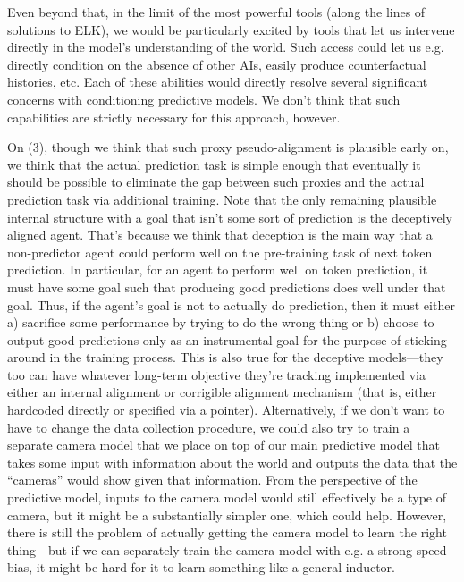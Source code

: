{Even beyond that, in the limit of the most powerful tools (along the lines of solutions to ELK), we would be particularly excited by tools that let us intervene directly in the model's understanding of the world. Such access could let us e.g. directly condition on the absence of other AIs, easily produce counterfactual histories, etc. Each of these abilities would directly resolve several significant concerns with conditioning predictive models. We don't think that such capabilities are strictly necessary for this approach, however.

     On (3), though we think that such proxy pseudo-alignment\cite{TODO: cite https://www.alignmentforum.org/s/r9tYkB2a8Fp4DN8yB/p/pL56xPoniLvtMDQ4J} is plausible early on, we think that the actual prediction task is simple enough that eventually it should be possible to eliminate the gap between such proxies and the actual prediction task via additional training.
     Note that the only remaining plausible internal structure with a goal that isn't some sort of prediction is the deceptively aligned agent. That's because we think that deception is the main way that a non-predictor agent could perform well on the pre-training task of next token prediction. In particular, for an agent to perform well on token prediction, it must have some goal such that producing good predictions does well under that goal. Thus, if the agent's goal is not to actually do prediction, then it must either a) sacrifice some performance by trying to do the wrong thing or b) choose to output good predictions only as an instrumental goal for the purpose of sticking around in the training process.
     This is also true for the deceptive models---they too can have whatever long-term objective they're tracking implemented via either an internal alignment or corrigible alignment mechanism (that is, either hardcoded directly or specified via a pointer).
     Alternatively, if we don't want to have to change the data collection procedure, we could also try to train a separate camera model that we place on top of our main predictive model that takes some input with information about the world and outputs the data that the ``cameras'' would show given that information. From the perspective of the predictive model, inputs to the camera model would still effectively be a type of camera, but it might be a substantially simpler one, which could help. However, there is still the problem of actually getting the camera model to learn the right thing---but if we can separately train the camera model with e.g. a strong speed bias, it might be hard for it to learn something like a general inductor.
}
